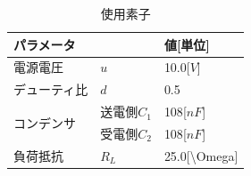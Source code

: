 \documentclass[12pt]{jarticle}
\begin{document}
\begin{table}[h]
	\centering
	\caption{使用素子}
	\label{tab:sosi}
	\begin{tabular}{|l|l|l|}
		\hline
		\multicolumn{2}{|l|}{パラメータ}       & 値{[}単位{]}                       \\ \hline
		電源電圧                   & $u$      & 10.0{[}$V${]}                   \\ \hline
		デューティ比                 & $d$      & 0.5                             \\ \hline
		\multirow{2}{*}{コンデンサ} & 送電側$C_1$ & 108{[}$nF${]}                   \\ \cline{2-3} 
		& 受電側$C_2$ & 108{[}$nF${]}                   \\ \hline
		負荷抵抗                   & $R_L$    & 25.0{[}\textbackslash{}Omega{]} \\ \hline
	\end{tabular}
\end{table}
\clearpage
\end{document}
